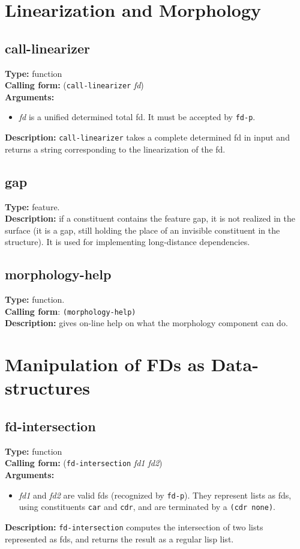 \documentclass[10pt,a4paper]{report}
\begin{document}
\section{Linearization and Morphology}
 

\subsection{call-linearizer}
{\bf Type:} function
\\{\bf Calling form:} ({\tt call-linearizer} {\em fd})
\\{\bf Arguments:} 
\begin{itemize}
\item {\em fd} is a unified determined total fd. It must be accepted by {\tt fd-p}.
\end{itemize}
{\bf Description:} {\tt call-linearizer} takes a complete determined
fd in input and returns a string corresponding to the
linearization of the fd.


\subsection{gap}
{\bf Type:} feature.
\\{\bf Description:} if a constituent contains the feature gap, it is
not realized in the surface (it is a gap, still holding the place
of an invisible constituent in the structure).  It is used for 
implementing long-distance dependencies.


\subsection{morphology-help}
{\bf Type:} function.
\\{\bf Calling form}: {\tt (morphology-help)}
\\{\bf Description:} gives on-line help on what the morphology component can do.



\section{Manipulation of FDs as Data-structures}


\subsection{fd-intersection}
{\bf Type:} function
\\{\bf Calling form:} ({\tt fd-intersection} {\em fd1 fd2})
\\{\bf Arguments:}
\begin{itemize}
\item {\em fd1} and {\em fd2} are valid fds (recognized by {\tt fd-p}). They represent
lists as fds, using constituents {\tt car} and {\tt cdr}, and are terminated by
a {\tt (cdr none)}.
\end{itemize}
{\bf Description:} {\tt fd-intersection} computes the intersection of
two lists represented as fds, and returns the result as a regular
lisp list.
\end{document}
